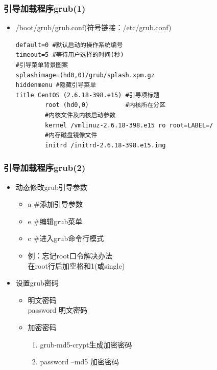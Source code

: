 \documentclass[xcolor=svgnames,presentation]{beamer}
\begin{document}
\begin{frame}[fragile]
\frametitle{引导加载程序grub(1)}
\label{sec-1-2}
\begin{itemize}

\item /boot/grub/grub.conf(符号链接：/etc/grub.conf)\\
\label{sec-1-2-1}%
\begin{verbatim}
default=0 #默认启动的操作系统编号
timeout=5 #等待用户选择的时间(秒)
#引导菜单背景图案
splashimage=(hd0,0)/grub/splash.xpm.gz
hiddenmenu #隐藏引导菜单
title CentOS (2.6.18-398.e15) #引导项标题
        root (hd0,0)          #内核所在分区
        #内核文件及内核启动参数
        kernel /vmlinuz-2.6.18-398.e15 ro root=LABEL=/
        #内存磁盘镜像文件
        initrd /initrd-2.6.18-398.e15.img
\end{verbatim}
\end{itemize} %
\end{frame}
\begin{frame}
\frametitle{引导加载程序grub(2)}
\label{sec-1-3}
\begin{itemize}

\item 动态修改grub引导参数
\label{sec-1-3-1}%
\begin{itemize}

\item a \#添加引导参数
\label{sec-1-3-1-1}%

\item e \#编辑grub菜单
\label{sec-1-3-1-2}%

\item c \#进入grub命令行模式
\label{sec-1-3-1-3}%

\item 例：忘记root口令解决办法\\
\label{sec-1-3-1-4}%
在root行后加空格和1(或single)
\end{itemize} %

\item 设置grub密码
\label{sec-1-3-2}%
\begin{itemize}

\item 明文密码\\
\label{sec-1-3-2-1}%
password 明文密码

\item 加密密码
\label{sec-1-3-2-2}%
\begin{enumerate}
\item grub-md5-crypt生成加密密码
\item password --md5 加密密码
\end{enumerate}
\end{itemize} %
\end{itemize} %
\end{frame}
\end{document}
